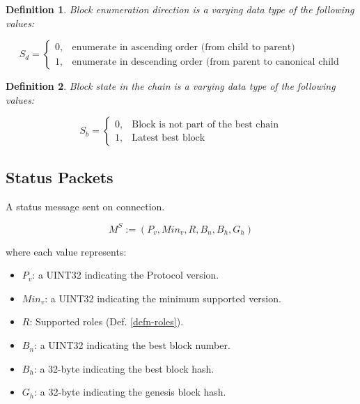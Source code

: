 \documentclass{book}
\newtheorem{definition}{Definition}
\begin{document}
\begin{definition}
    \label{defn-sequence-direction}
    Block enumeration direction is a varying data type of the following values:

    \begin{equation*}
      S_d =
      \begin{cases}
        0, & \text{enumerate in ascending order (from child to parent)} \\
        1, & \text{enumerate in descending order (from parent to canonical child}
      \end{cases}
    \end{equation*}
\end{definition}

\begin{definition}
    \label{defn-block-state}
    Block state in the chain is a varying data type of the following values:

    \begin{equation*}
      S_b =
      \begin{cases}
        0, & \text{Block is not part of the best chain} \\
        1, & \text{Latest best block}
      \end{cases}
    \end{equation*}
\end{definition}

\subsection{Status Packets}

A status message sent on connection.

\[
    M^S := (P_v, Min_v, R, B_n, B_h, G_h)
\]

where each value represents:

\begin{itemize}
    \item $P_v$: a UINT32 indicating the Protocol version.
    \item $Min_v$: a UINT32 indicating the minimum supported version.
    \item $R$: Supported roles (Def. \ref{defn-roles}).
    \item $B_n$: a UINT32 indicating the best block number.
    \item $B_h$: a 32-byte indicating the best block hash.
    \item $G_h$: a 32-byte indicating the genesis block hash.
\end{itemize}
\end{document}
